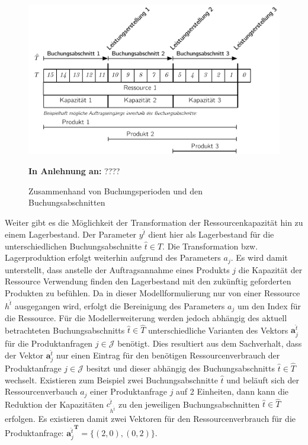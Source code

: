 \begin{figure}[h!]
  \begin{center}
    \includegraphics[width=130mm]{Bilder/Leistungsperioden.pdf}
    \caption{Zusammenhand von Buchungsperioden und den Buchungsabschnitten}  \label{LP}
    {\footnotesize \textbf{In Anlehnung an:} ????} 
  \end{center}
\end{figure}

Weiter gibt es die Möglichkeit der Transformation der Ressourcenkapazität hin zu einem Lagerbestand. Der Parameter $y^{\hat{t}}$ dient hier als Lagerbestand für die unterschiedlichen Buchungsabschnitte $\hat{t}\in\hat{T}$. Die Transformation bzw. Lagerproduktion erfolgt weiterhin aufgrund des Parameters $a_j$. Es wird damit unterstellt, dass anstelle der Auftragsannahme eines Produkts $j$ die Kapazität der Ressource Verwendung finden den Lagerbestand mit den zukünftig geforderten Produkten zu befühlen. Da in dieser Modellformulierung nur von einer Ressource $h^{\hat{t}}$ ausgegangen wird, erfolgt die Bereinigung des Parameters $a_{j}$ um den Index für die Ressource. Für die Modellerweiterung werden jedoch abhängig des aktuell betrachteten Buchungsabschnitts $\hat{t}\in\hat{T}$ unterschiedliche Varianten des Vektors $\textbf{a}_{j}^{\hat{t}}$ für die Produktanfragen $j\in\mathcal{J}$ benötigt. Dies resultiert aus dem Sachverhalt, dass der Vektor $\textbf{a}_{j}^{\hat{t}}$ nur einen Eintrag für den benötigen Ressourcenverbrauch der Produktanfrage $j\in\mathcal{J}$ besitzt und dieser abhängig des Buchungsabschnitts $\hat{t}\in\hat{T}$ wechselt. Existieren zum Beispiel zwei Buchungsabschnitte $\hat{t}$ und beläuft sich der Ressourcenverbauch $a_j$ einer Produktanfrage $j$ auf 2 Einheiten, dann kann die Reduktion der Kapazitäten $c^{\hat{t}}_{h^{\hat{t}}}$ zu den jeweiligen Buchungsabschnitten $\hat{t}\in\hat{T}$ erfolgen. Es existieren damit zwei Vektoren für den Ressourcenverbrauch für die Produktanfrage: ${\textbf{a}_{j}^{\hat{t}}}^{\textbf{T}}=\{ (2,0), (0,2)\}$.


